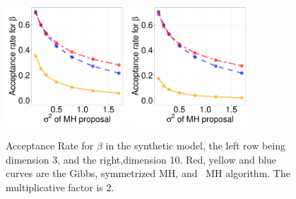   \begin{figure}[H]
  \centering

  \begin{minipage}[!hp]{0.99\linewidth}
    \includegraphics [width=0.40\textwidth, angle=0]{figs/acc/EXP_D3beta_k2.pdf}
	\hspace{.5in}
    \includegraphics [width=0.40\textwidth, angle=0]{figs/acc/EXP_D10beta_k2.pdf}
  \end{minipage}
    \caption{Acceptance Rate for $\beta$ in the synthetic model, the left row being dimension 3, and the right,dimension 10.  Red, yellow and blue curves are the Gibbs, symmetrized MH,
 and \naive\ MH  algorithm. The multiplicative factor is $2$. }
     \label{fig:ACC_EXP}
  \end{figure}
